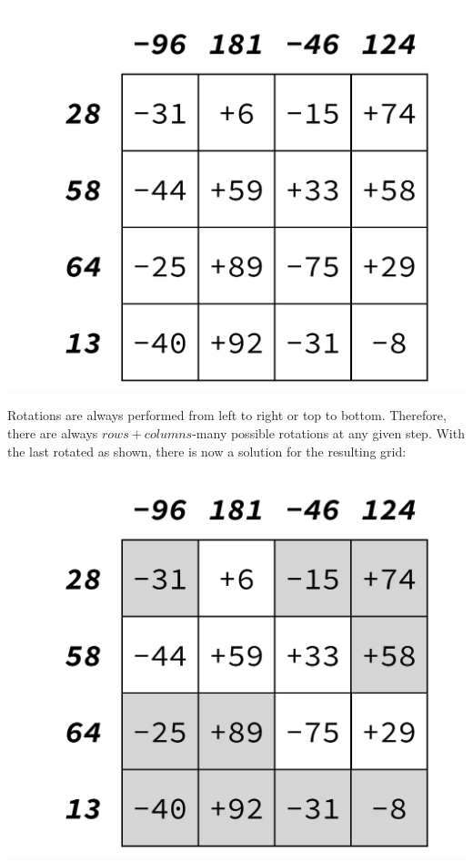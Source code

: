\begin{center}
	\includegraphics[scale=0.4,trim=0 30 0 30]{cswk/lac3r.pdf}
\end{center}
Rotations are always performed from left to right or top to bottom. Therefore, there are always $\mathit{rows}+\mathit{columns}$-many possible rotations at any given step. With the last rotated as shown, there is now a solution for the resulting grid:
\begin{center}
	\includegraphics[scale=0.4,trim=0 30 0 30]{cswk/lac3s.pdf}
\end{center}
